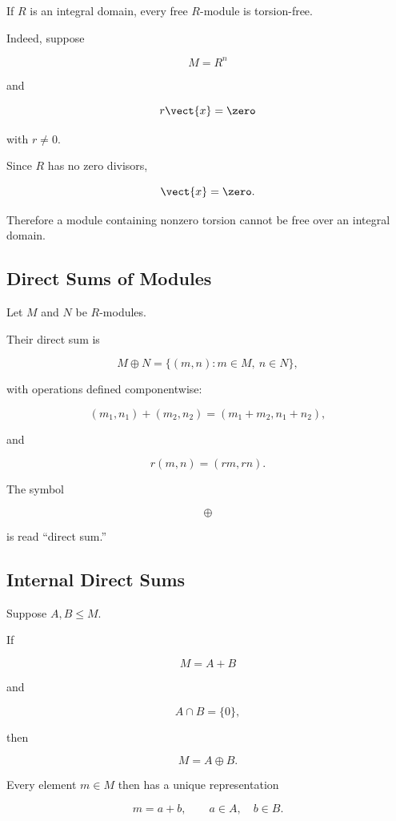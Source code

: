 If \(R\) is an integral domain, every free \(R\)-module is torsion-free.

Indeed, suppose

\[ M=R^n \]

and

\[ r\vect{x}=\zero \]

with \(r\neq0\).

Since \(R\) has no zero divisors,

\[ \vect{x}=\zero. \]

Therefore a module containing nonzero torsion cannot be free over an integral
domain.

\subsection{Direct Sums of Modules}
\label{subsec:direct-sums-modules}

Let \(M\) and \(N\) be \(R\)-modules.

Their direct sum is

\[ M\oplus N=\{(m,n):m\in M,\ n\in N\}, \]

with operations defined componentwise:

\[ (m_1,n_1)+(m_2,n_2)=(m_1+m_2,n_1+n_2), \]

and

\[ r(m,n)=(rm,rn). \]

The symbol

\[ \oplus \]

is read ``direct sum.''

\subsection{Internal Direct Sums}
\label{subsec:internal-direct-sums}

Suppose \(A,B\leq M\).

If

\[ M=A+B \]

and

\[ A\cap B=\{0\}, \]

then

\[ M=A\oplus B. \]

Every element \(m\in M\) then has a unique representation

\[ m=a+b,\qquad a\in A,\quad b\in B. \]


